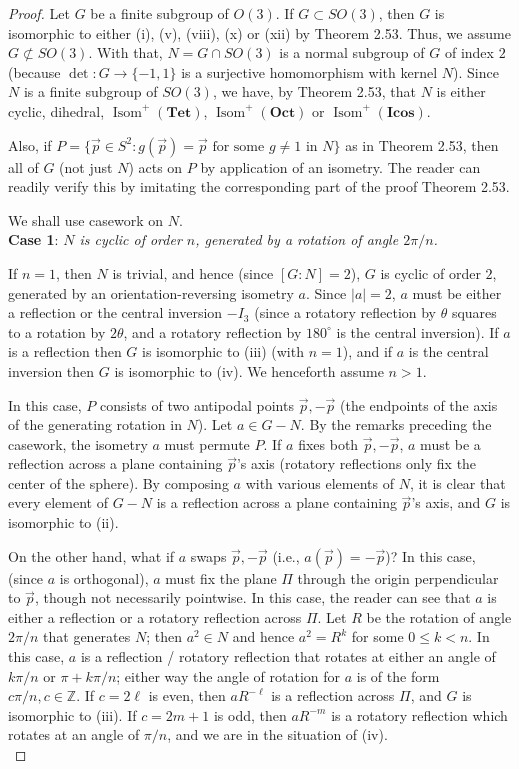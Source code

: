 \documentclass[leqno]{book}
\begin{document}
\begin{proof}
Let $G$ be a finite subgroup of $O(3)$.  If $G\subset SO(3)$, then $G$ is isomorphic to either (i), (v), (viii), (x) or (xii) by Theorem 2.53.  Thus, we assume $G\not\subset SO(3)$.  With that, $N=G\cap SO(3)$ is a normal subgroup of $G$ of index $2$ (because $\det:G\to\{-1,1\}$ is a surjective homomorphism with kernel $N$).  Since $N$ is a finite subgroup of $SO(3)$, we have, by Theorem 2.53, that $N$ is either cyclic, dihedral, $\operatorname{Isom}^+(\mathbf{Tet})$, $\operatorname{Isom}^+(\mathbf{Oct})$ or $\operatorname{Isom}^+(\mathbf{Icos})$.

Also, if $P=\{\vec p\in S^2:g(\vec p)=\vec p\text{ for some }g\ne 1\text{ in }N\}$ as in Theorem 2.53, then all of $G$ (not just $N$) acts on $P$ by application of an isometry.  The reader can readily verify this by imitating the corresponding part of the proof Theorem 2.53.

We shall use casework on $N$.\\

\noindent\textbf{Case 1}: \emph{$N$ is cyclic of order $n$, generated by a rotation of angle $2\pi/n$.}

If $n=1$, then $N$ is trivial, and hence (since $[G:N]=2$), $G$ is cyclic of order $2$, generated by an orientation-reversing isometry $a$.  Since $|a|=2$, $a$ must be either a reflection or the central inversion $-I_3$ (since a rotatory reflection by $\theta$ squares to a rotation by $2\theta$, and a rotatory reflection by $180^\circ$ is the central inversion).  If $a$ is a reflection then $G$ is isomorphic to (iii) (with $n=1$), and if $a$ is the central inversion then $G$ is isomorphic to (iv).  We henceforth assume $n>1$.

In this case, $P$ consists of two antipodal points $\vec p,-\vec p$ (the endpoints of the axis of the generating rotation in $N$).  Let $a\in G-N$.  By the remarks preceding the casework, the isometry $a$ must permute $P$.  If $a$ fixes both $\vec p,-\vec p$, $a$ must be a reflection across a plane containing $\vec p$'s axis (rotatory reflections only fix the center of the sphere).  By composing $a$ with various elements of $N$, it is clear that every element of $G-N$ is a reflection across a plane containing $\vec p$'s axis, and $G$ is isomorphic to (ii).

On the other hand, what if $a$ swaps $\vec p,-\vec p$ (i.e., $a(\vec p)=-\vec p$)?  In this case, (since $a$ is orthogonal), $a$ must fix the plane $\Pi$ through the origin perpendicular to $\vec p$, though not necessarily pointwise.  In this case, the reader can see that $a$ is either a reflection or a rotatory reflection across $\Pi$. Let $R$ be the rotation of angle $2\pi/n$ that generates $N$; then $a^2\in N$ and hence $a^2=R^k$ for some $0\leqslant k<n$.  In this case, $a$ is a reflection / rotatory reflection that rotates at either an angle of $k\pi/n$ or $\pi+k\pi/n$; either way the angle of rotation for $a$ is of the form $c\pi/n,c\in\mathbb Z$.  If $c=2\ell$ is even, then $aR^{-\ell}$ is a reflection across $\Pi$, and $G$ is isomorphic to (iii).  If $c=2m+1$ is odd, then $aR^{-m}$ is a rotatory reflection which rotates at an angle of $\pi/n$, and we are in the situation of (iv).\\


\end{proof}
\end{document}
